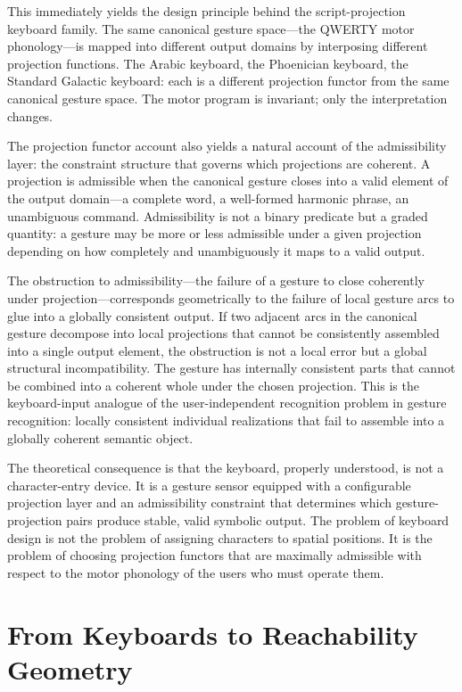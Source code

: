 \documentclass[12pt,a4paper]{article}
\theoremstyle{plain}
\theoremstyle{definition}
\theoremstyle{remark}
\begin{document}
This immediately yields the design principle behind the script-projection
keyboard family. The same canonical gesture space---the QWERTY motor
phonology---is mapped into different output domains by interposing different
projection functions. The Arabic keyboard, the Phoenician keyboard, the Standard
Galactic keyboard: each is a different projection functor from the same
canonical gesture space. The motor program is invariant; only the interpretation
changes.

The projection functor account also yields a natural account of the admissibility
layer: the constraint structure that governs which projections are coherent.
A projection is admissible when the canonical gesture closes into a valid element
of the output domain---a complete word, a well-formed harmonic phrase, an
unambiguous command. Admissibility is not a binary predicate but a graded
quantity: a gesture may be more or less admissible under a given projection
depending on how completely and unambiguously it maps to a valid output.

The obstruction to admissibility---the failure of a gesture to close coherently
under projection---corresponds geometrically to the failure of local gesture
arcs to glue into a globally consistent output. If two adjacent arcs in the
canonical gesture decompose into local projections that cannot be consistently
assembled into a single output element, the obstruction is not a local error but
a global structural incompatibility. The gesture has internally consistent parts
that cannot be combined into a coherent whole under the chosen projection. This
is the keyboard-input analogue of the user-independent recognition problem in
gesture recognition: locally consistent individual realizations that fail to
assemble into a globally coherent semantic object.

The theoretical consequence is that the keyboard, properly understood, is not
a character-entry device. It is a gesture sensor equipped with a configurable
projection layer and an admissibility constraint that determines which
gesture-projection pairs produce stable, valid symbolic output. The problem
of keyboard design is not the problem of assigning characters to spatial
positions. It is the problem of choosing projection functors that are maximally
admissible with respect to the motor phonology of the users who must operate
them.

\section{From Keyboards to Reachability Geometry}
\end{document}
